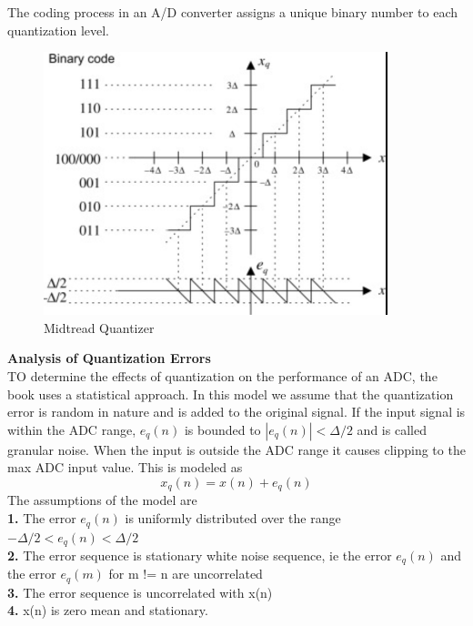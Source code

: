 \documentclass{article} %
\begin{document}
	The coding process in an A/D converter assigns a unique binary number to each quantization level. 
	
	\begin{figure}[h]
	\centering
	\includegraphics[width=10cm]{ch6_quant}
	\caption{Midtread Quantizer}
	\end{figure}
	\textbf{Analysis of Quantization Errors}\\
	
	TO determine the effects of quantization on the performance of an ADC, the book uses a statistical approach. In this model we assume that the quantization error is random in nature and is added to the original signal. If the input signal is within the ADC range, $e_q(n)$ is bounded to $|e_q(n)| < \Delta/2$ and is called granular noise. When the input is outside the ADC range it causes clipping to the max ADC input value. This is modeled as
	\begin{equation}
	x_q(n) = x(n) + e_q(n)
	\end{equation}
	The assumptions of the model are\\
	\textbf{1.} The error $e_q(n)$ is uniformly distributed over the range $-\Delta /2 < e_q(n) < \Delta /2$\\
	\textbf{2.} The error sequence is stationary white noise sequence, ie the error $e_q(n)$ and the error $e_q(m)$ for m != n are uncorrelated \\
	\textbf{3.} The error sequence is uncorrelated with x(n)\\
	\textbf{4.} x(n) is zero mean and stationary.\\
	
\end{document}
